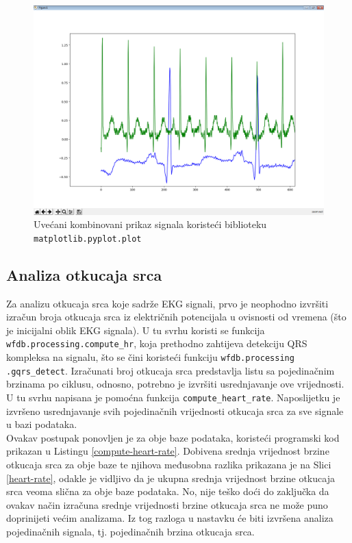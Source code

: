 \documentclass[12pt,a4paper]{article}
\begin{document}
\begin{figure}[H]
\center
\includegraphics[scale=0.45]{../res/plot-combined-zoom.PNG}
\caption{Uvećani kombinovani prikaz signala koristeći biblioteku \texttt{matplotlib.pyplot.plot}}
\label{combined-zoom}
\end{figure}

\subsection{Analiza otkucaja srca}

\quad Za analizu otkucaja srca koje sadrže EKG signali, prvo je neophodno izvršiti izračun broja otkucaja srca iz električnih potencijala u ovisnosti od vremena (što je inicijalni oblik EKG signala). U tu svrhu koristi se funkcija \texttt{wfdb.processing.compute\_hr}, koja prethodno zahtijeva detekciju QRS kompleksa na signalu, što se čini koristeći funkciju \texttt{wfdb.processing} \texttt{.gqrs\_detect}. Izračunati broj otkucaja srca predstavlja listu sa pojedinačnim brzinama po ciklusu, odnosno, potrebno je izvršiti usrednjavanje ove vrijednosti. U tu svrhu napisana je pomoćna funkcija \texttt{compute\_heart\_rate}. Naposlijetku je izvršeno usrednjavanje svih pojedinačnih vrijednosti otkucaja srca za sve signale u bazi podataka. \\

Ovakav postupak ponovljen je za obje baze podataka, koristeći programski kod prikazan u Listingu \ref{compute-heart-rate}. Dobivena srednja vrijednost brzine otkucaja srca za obje baze te njihova međusobna razlika prikazana je na Slici \ref{heart-rate}, odakle je vidljivo da je ukupna srednja vrijednost brzine otkucaja srca veoma slična za obje baze podataka. No, nije teško doći do zaključka da ovakav način izračuna srednje vrijednosti brzine otkucaja srca ne može puno doprinijeti većim analizama. Iz tog razloga u nastavku će biti izvršena analiza pojedinačnih signala, tj. pojedinačnih brzina otkucaja srca.
\end{document}
